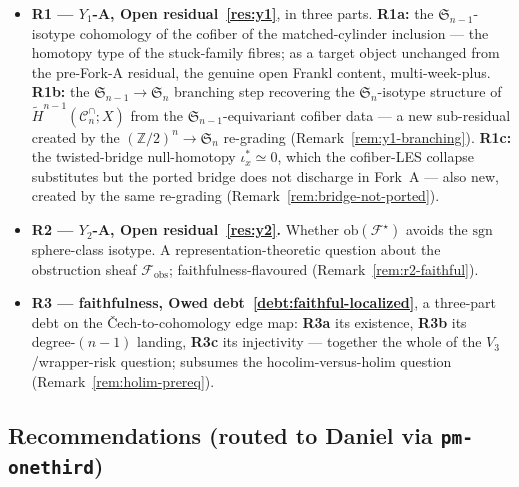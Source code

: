 \documentclass[11pt,oneside]{amsart}
\theoremstyle{plain}
\theoremstyle{definition}
\theoremstyle{remark}
\theoremstyle{honeststyle}
\newcommand{\F}{\mathcal{F}}
\newcommand{\Fstar}{\F^{\star}}
\newcommand{\sgn}{\mathrm{sgn}}
\newcommand{\Sym}{\mathfrak{S}}
\newcommand{\Z}{\mathbb{Z}}
\newcommand{\Cn}{\mathcal{C}^{\cap}_n}
\newcommand{\ob}{\mathrm{ob}}
\newcommand{\fobs}{\mathcal{F}_{\mathrm{obs}}}
\begin{document}
\begin{itemize}[leftmargin=1.7em]
\item \textbf{R1 --- $Y_1$-A, Open residual~\ref{res:y1}}, in three
  parts. \textbf{R1a:} the $\Sym_{n-1}$-isotype cohomology of the
  cofiber of the matched-cylinder inclusion --- the homotopy type of
  the stuck-family fibres; as a target object unchanged from the
  pre-Fork-A residual, the genuine open Frankl content,
  multi-week-plus. \textbf{R1b:} the $\Sym_{n-1}\to\Sym_n$ branching
  step recovering the $\Sym_n$-isotype structure of $\widetilde
  H^{n-1}(\Cn;X)$ from the $\Sym_{n-1}$-equivariant cofiber data --- a
  new sub-residual created by the $(\Z/2)^n\to\Sym_n$ re-grading
  (Remark~\ref{rem:y1-branching}). \textbf{R1c:} the twisted-bridge
  null-homotopy $\iota_x^{*}\simeq0$, which the cofiber-LES collapse
  substitutes but the ported bridge does not discharge in Fork~A ---
  also new, created by the same re-grading
  (Remark~\ref{rem:bridge-not-ported}).
\item \textbf{R2 --- $Y_2$-A, Open residual~\ref{res:y2}.} Whether
  $\ob(\Fstar)$ avoids the $\sgn$ sphere-class isotype. A
  representation-theoretic question about the obstruction sheaf
  $\fobs$; faithfulness-flavoured (Remark~\ref{rem:r2-faithful}).
\item \textbf{R3 --- faithfulness, Owed
  debt~\ref{debt:faithful-localized}}, a three-part debt on the
  \v{C}ech-to-cohomology edge map: \textbf{R3a} its existence,
  \textbf{R3b} its degree-$(n-1)$ landing, \textbf{R3c} its
  injectivity --- together the whole of the $V_3$/wrapper-risk
  question; subsumes the hocolim-versus-holim question
  (Remark~\ref{rem:holim-prereq}).
\end{itemize}

\subsection{Recommendations (routed to Daniel via \texttt{pm-onethird})}
\label{ssec:recommendations}
\end{document}
